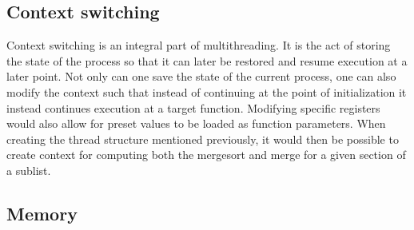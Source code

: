 \subsection{Context switching}
Context switching is an integral part of multithreading. It is the act of
storing the state of the process so that it can later be restored and resume
execution at a later point. Not only can one save the state of the current
process, one can also modify the context such that instead of continuing at the
point of initialization it instead continues execution at a target function.
Modifying specific registers would also allow for preset values to be loaded as
function parameters. When creating the thread structure mentioned previously, it
would then be possible to create context for computing both the mergesort and
merge for a given section of a sublist.


\subsection{Memory}
